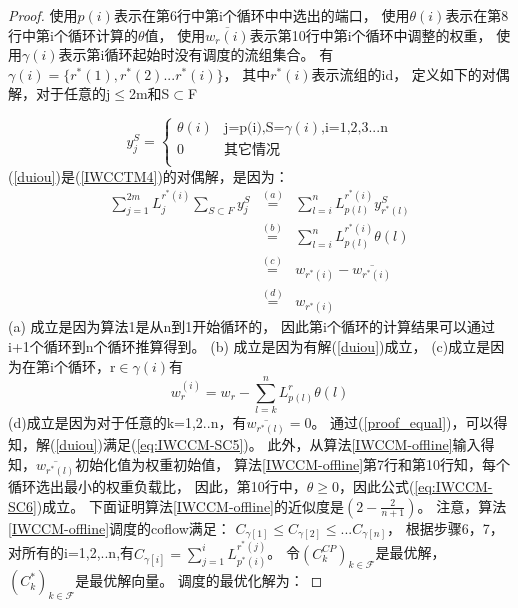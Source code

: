 \begin{proof}
使用$p(i)$表示在第6行中第i个循环中中选出的端口，
使用$\theta(i)$表示在第8行中第i个循环计算的$\theta$值，
使用$\overline{w_r(i)}$表示第10行中第i个循环中调整的权重，
使用$\gamma(i)$表示第i循环起始时没有调度的流组集合。
有$\gamma(i)=\{r^*(1),r^*(2)...r^*(i)\}$，
其中$r^*(i)$表示流组的id，
定义如下的对偶解，对于任意的j$\leq $2m和S$\subset$F

\begin{equation}
\label{duiou}
 y_j^S=\left\{
\begin{array}{rcl}
\theta(i) &\text{j=p(i),S=$\gamma(i)$,i=1,2,3...n}\\
0 &\text{其它情况}\\
\end{array} \right. 
\end{equation}
(\ref{duiou})是(\ref{IWCCTM4})的对偶解，是因为：
\begin{eqnarray}\label{proof_equal}
\sum_{j=1}^{2m} L_{j}^{r^*(i)} \sum_{S\subset F} y_j^S
&\overset{(a)}{=}&\sum_{l=i}^{n}  L_{p(l)}^{r^*(i)} y_{r^*(l)}^S\nonumber \\
&\overset{(b)}{=}&\sum_{l=i}^{n}  L_{p(l)}^{r^*(i)} \theta(l)\nonumber \\
&\overset{(c)}{=}& w_{r^*(i)}-\overline{w_{r^*(i)}}\nonumber \\
&\overset{(d)}{=}&w_{r^*(i)}
\end{eqnarray}
(a) 成立是因为算法1是从n到1开始循环的， 因此第i个循环的计算结果可以通过i+1个循环到n个循环推算得到。
(b) 成立是因为有解(\ref{duiou})成立，
(c)成立是因为在第i个循环，r$\in \gamma(i)$有 
\begin{equation}
w_r^{(i)}=w_r-\sum_{l=k}^{n}L_{p(l)}^r\theta(l)
\end{equation}
(d)成立是因为对于任意的k=1,2..n，有$\overline{w_{r^*(l)}}=0$。
通过(\ref{proof_equal})，可以得知，解(\ref{duiou})满足(\ref{eq:IWCCM-SC5})。
此外，从算法\ref{IWCCM-offline}输入得知，$\overline{w_{r^*(l)}}$初始化值为权重初始值，
算法\ref{IWCCM-offline}第7行和第10行知，每个循环选出最小的权重负载比，
因此，第10行中，$\theta \geq 0$，因此公式(\ref{eq:IWCCM-SC6})成立。
下面证明算法\ref{IWCCM-offline}的近似度是$(2-\frac{2}{n+1})$。
注意，算法\ref{IWCCM-offline}调度的coflow满足：
$C_{\gamma[1]} \leq C_{\gamma[2]} \leq... C_{\gamma[n]}$，
根据步骤6，7，对所有的i=1,2,..n,有$C_{\gamma[i]}=\sum_{j=1}^i L_{p^*(i)}^{r^*(j)}$。
令$(C_k^{CP})_{k \in \mathcal{F}}$是最优解，$(C_k^{*})_{k \in \mathcal{F}}$是最优解向量。
调度的最优化解为：



\end{proof}
